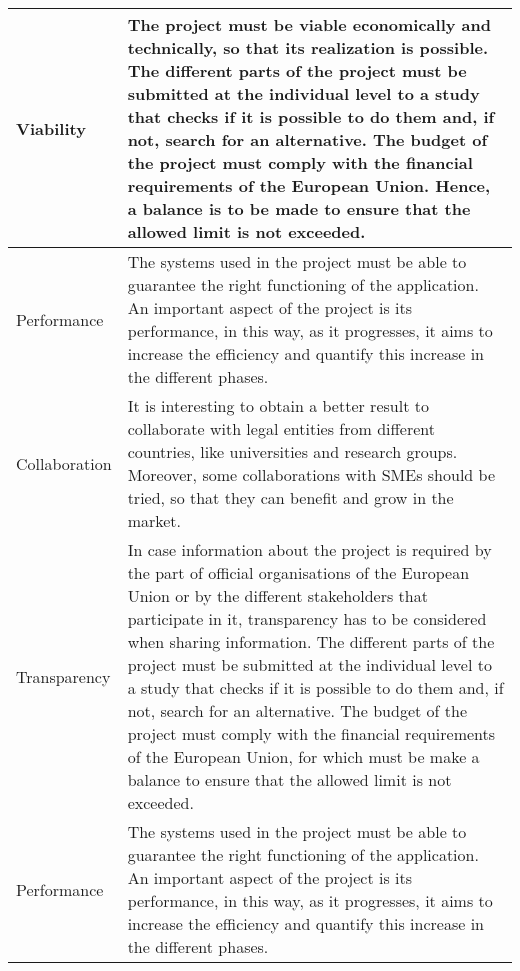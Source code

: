 \begin{longtable}[H]{lp{10.2cm}}
	Viability & The project must be viable economically and technically, so that its realization is possible. \newline
	The different parts of the project must be submitted at the individual level to a study that checks if it is possible to do them and, if not, search for an alternative. \newline
	The budget of the project must comply with the financial requirements of the European Union. Hence, a balance is to be made to ensure that the allowed limit is not exceeded. \vspace{0.2cm}
	\\ \midrule
	
	Performance & The systems used in the project must be able to guarantee the right functioning of the application. An important aspect of the project is its performance, in this way, as it progresses, it aims to increase the efficiency and quantify this increase in the different phases. \vspace{0.2cm}
	\\ \midrule
	
	Collaboration & It is interesting to obtain a better result to collaborate with legal entities from different countries, like universities and research groups. Moreover, some collaborations with SMEs should be tried, so that they can benefit and grow in the market. \vspace{0.2cm}	
	\\ \midrule
	
	Transparency & In case information about the project is required by the part of official organisations of the European Union or by the different stakeholders that participate in it, transparency has to be considered when sharing information. 
	\newline
	The different parts of the project must be submitted at the individual level to a study that checks if it is possible to do them and, if not, search for an alternative. 
	\newline
	The budget of the project must comply with the financial requirements of the European Union, for which must be make a balance to ensure that the allowed limit is not exceeded. \vspace{0.2cm}
	\\ \midrule

	Performance & The systems used in the project must be able to guarantee the right functioning of the application. An important aspect of the project is its performance, in this way, as it progresses, it aims to increase the efficiency and quantify this increase in the different phases. \vspace{0.2cm}
	\\ \midrule


\end{longtable}
